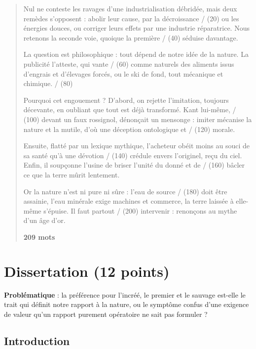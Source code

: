 \documentclass[11pt,a4paper]{article}
\begin{document}
\begin{quote}

Nul ne conteste les ravages d'une industrialisation débridée, mais deux remèdes s'opposent : abolir leur cause, par la décroissance / (20) ou les énergies douces, ou corriger leurs effets par une industrie réparatrice. Nous retenons la seconde voie, quoique la première / (40) séduise davantage.

La question est philosophique : tout dépend de notre idée de la nature. La publicité l'atteste, qui vante / (60) comme naturels des aliments issus d'engrais et d'élevages forcés, ou le ski de fond, tout mécanique et chimique. / (80)

Pourquoi cet engouement ? D'abord, on rejette l'imitation, toujours décevante, en oubliant que tout est déjà transformé. Kant lui-même, / (100) devant un faux rossignol, dénonçait un mensonge : imiter mécanise la nature et la mutile, d'où une déception ontologique et / (120) morale.

Ensuite, flatté par un lexique mythique, l'acheteur obéit moins au souci de sa santé qu'à une dévotion / (140) crédule envers l'originel, reçu du ciel. Enfin, il soupçonne l'usine de briser l'unité du donné et de / (160) bâcler ce que la terre mûrit lentement.

Or la nature n'est ni pure ni sûre : l'eau de source / (180) doit être assainie, l'eau minérale exige machines et commerce, la terre laissée à elle-même s'épuise. Il faut partout / (200) intervenir : renonçons au mythe d'un âge d'or.

\textbf{209 mots}

\end{quote}

\hypertarget{dissertation-12-points}{%
\section{Dissertation (12 points)}\label{dissertation-12-points}}

\textbf{Problématique} : la préférence pour l'incréé, le premier et le sauvage est-elle le trait qui définit notre rapport à la nature, ou le symptôme confus d'une exigence de valeur qu'un rapport purement opératoire ne sait pas formuler ?

\hypertarget{introduction}{%
\subsection{Introduction}\label{introduction}}
\end{document}
